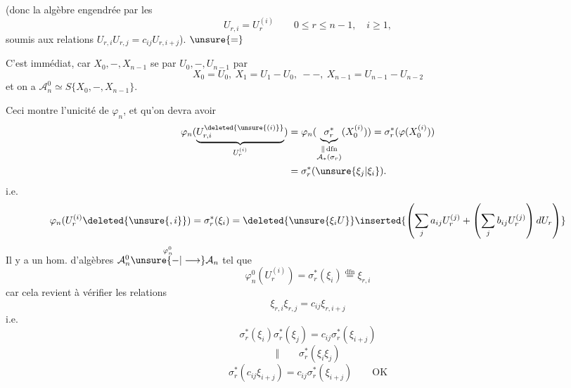  (donc la algèbre engendrée par les
\[
U_{r,i}=U_r^{(i)}\qquad0\le r\le n-1,\quad i\ge1,
\]
soumis aux relations $U_{r,i}U_{r,j}=c_{ij}U_{r,i+j}$).  $\unsure{=}$

C'est immédiat, car $X_0,-,X_{n-1}$ se  par $U_0,-,U_{n-1}$ par
\[
X_0=U_0,\ X_1=U_1-U_0,\ --,\ X_{n-1}=U_{n-1}-U_{n-2}
\]
et on a $\mathcal A_n^0\simeq S\{X_0,-,X_{n-1}\}$. 

Ceci montre l'unicité de $\varphi_n$, et qu'on devra avoir
\[
\begin{aligned}
\varphi_n(\underbrace{U_{r,i}^{\deleted{\unsure{(i)}}}}_{U_r^{(i)}})
&=\varphi_n(\underbrace{\sigma_r^*}_{\substack{\Vert\,\mathrm{dfn}\\\mathcal A_*(\sigma_r)}}(X_0^{(i)}))
=\sigma_r^*(\varphi(X_0^{(i)}))\\
&=\sigma_r^*(\unsure{\xi_j|\xi_i}).
\end{aligned}
\]
i.e.
\[
\varphi_n(U_r^{(i)}\deleted{\unsure{,i}})=\sigma_r^*(\xi_i)=\deleted{\unsure{\xi_iU}}
\inserted{\left(\sum_j a_{ij}U_r^{(j)}+\left(\sum_j b_{ij}U_r^{(j)}\right)dU_r\right)}
\]
Il y a  un hom. d'algèbres  $\mathcal A_n^0\overset{\varphi_n^0}{\unsure{-|\longrightarrow}}\mathcal A_n$ tel que
\[
\varphi_n^0(U_r^{(i)})=\sigma_r^*(\xi_i)\overset{\mathrm{dfn}}=\xi_{r,i}
\]
car cela revient à vérifier les relations
\[
\xi_{r,i}\xi_{r,j}=c_{ij}\xi_{r,i+j}
\]
i.e.
\[
\sigma_r^*(\xi_i)\sigma_r^*(\xi_j)=c_{ij}\sigma_r^*(\xi_{i+j})
\]
\[
\Vert\qquad\sigma_r^*(\xi_i\xi_j)
\]
\[
\sigma_r^*(c_{ij}\xi_{i+j})=c_{ij}\sigma_r^*(\xi_{i+j})\qquad\text{OK}
\]
